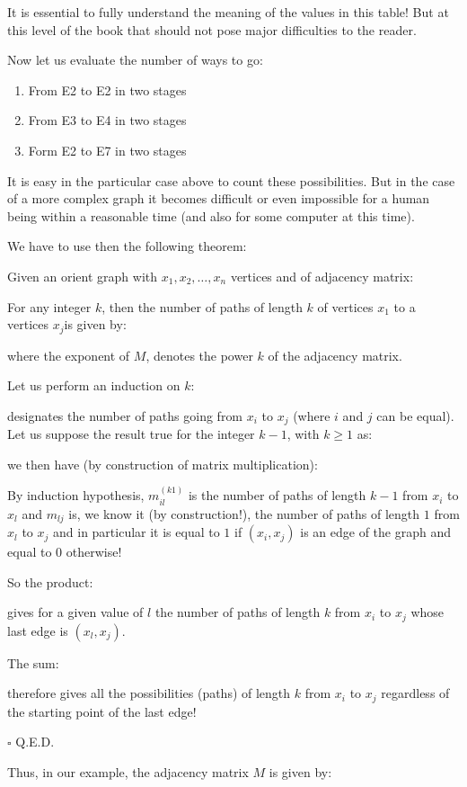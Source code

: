 {	It is essential to fully understand the meaning of the values in this table! But at this level of the book that should not pose major difficulties to the reader.
	
	Now let us evaluate the number of ways to go:
	\begin{enumerate}
		\item From E2 to E2 in two stages
		\item From E3 to E4 in two stages
		\item Form E2 to E7 in two stages
	\end{enumerate}
	It is easy in the particular case above to count these possibilities. But in the case of a more complex graph it becomes difficult or even impossible for a human being within a reasonable time (and also for some computer at this time).
	
	We have to use then the following theorem:
	\begin{theorem}
	Given an orient graph with $x_1,x_2,\ldots, x_n$ vertices and of adjacency matrix:
	
	For any integer $k$, then the number of paths of length $k$ of vertices $x_1$ to a vertices $x_j$is given by:
	
	where the exponent of $M$, denotes the power $k$ of the adjacency matrix.
	\end{theorem}
	\begin{dem}
	Let us perform an induction on $k$:
	
	designates the number of paths going from $x_i$ to $x_j$ (where $i$ and $j$ can be equal). Let us suppose the result true for the integer $k-1$, with $k\geq 1$ as:
	
	we then have (by construction of matrix multiplication):
	
	By induction hypothesis, $m_{il}^{(k­1)}$ is the number of paths of length $k-1$ from $x_i$ to $x_l$ and $m_{lj}$ is, we know it (by construction!), the number of paths of length $1$ from $x_l$ to $x_j$ and in particular it is equal to $1$ if $(x_i,x_j)$ is an edge of the graph and equal to $0$ otherwise!
	
	So the product:
	
	gives for a given value of $l$ the number of paths of length $k$ from $x_i$ to $x_j$ whose last edge is $(x_l,x_j)$.

	The sum:
	
	therefore gives all the possibilities (paths) of length $k$ from $x_i$ to $x_j$ regardless of the starting point of the last edge!
	\begin{flushright}
		$\square$  Q.E.D.
	\end{flushright}
	\end{dem}
	Thus, in our example, the adjacency matrix $M$ is given by:
	
}
